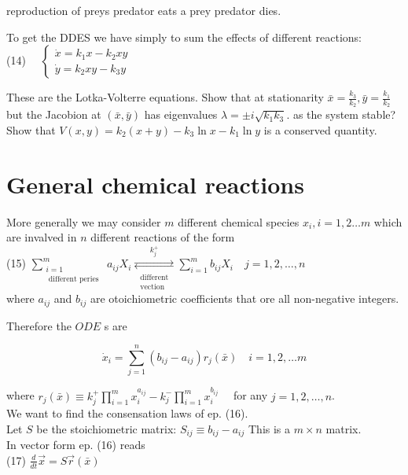 \documentclass[10pt]{article}
\begin{document}
reproduction of preys predator eats a prey predator dies.

To get the DDES we have simply to sum the effects of different reactions:\\
(14) $\quad\left\{\begin{array}{l}\dot{x}=k_{1} x-k_{2} x y \\ \dot{y}=k_{2} x y-k_{3} y\end{array}\right.$

These are the Lotka-Volterre equations. Show that at stationarity $\bar{x}=\frac{k_{3}}{k_{2}}, \bar{y}=\frac{k_{1}}{k_{2}}$ but the Jacobion at $(\bar{x}, \bar{y})$ has eigenvalues $\lambda= \pm i \sqrt{k_{1} k_{3}}$. as the system stable? Show that $V(x, y)=k_{2}(x+y)-k_{3} \ln x-k_{1} \ln y$ is a conserved quantity.

\section*{General chemical reactions}
More generally we may consider $m$ different chemical species $x_{i}, i=1,2 \ldots m$ which are invalved in $n$ different reactions of the form\\
(15) $\sum_{\substack{i=1 \\ \text { different peries }}}^{m} a_{i j} X_{i} \underset{\substack{\text { different } \\ \text { vection }}}{\stackrel{k_{j}^{+}}{\rightleftarrows}} \sum_{i=1}^{m} b_{i j} X_{i} \quad j=1,2, \ldots, n$\\
where $a_{i j}$ and $b_{i j}$ are otoichiometric coefficients that ore all non-negative integers.

Therefore the $O D E$ s are


\begin{equation*}
\dot{x}_{i}=\sum_{j=1}^{n}\left(b_{i j}-a_{i j}\right) r_{j}(\bar{x}) \quad i=1,2, \ldots m \tag{16}
\end{equation*}


where $r_{j}(\bar{x}) \equiv k_{j}^{+} \prod_{i=1}^{m} x_{i}^{a_{i j}}-k_{j}^{-} \prod_{i=1}^{m} x_{i}^{b_{i j}} \quad$ for any $j=1,2, \ldots, n$.\\
We want to find the consensation laws of ep. (16).\\
Let $S$ be the stoichiometric matrix: $S_{i j} \equiv b_{i j}-a_{i j}$ This is a $m \times n$ matrix.\\
In vector form ep. (16) reads\\
(17) $\frac{d}{d t} \vec{x}=S \vec{r}(\bar{x})$
\end{document}
